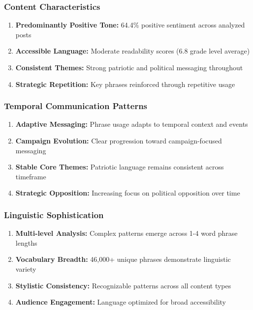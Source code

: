 \documentclass[12pt,a4paper]{article}
\begin{document}
\subsubsection{Content Characteristics}
\begin{enumerate}
\item \textbf{Predominantly Positive Tone:} 64.4\% positive sentiment across analyzed posts
\item \textbf{Accessible Language:} Moderate readability scores (6.8 grade level average)
\item \textbf{Consistent Themes:} Strong patriotic and political messaging throughout
\item \textbf{Strategic Repetition:} Key phrases reinforced through repetitive usage
\end{enumerate}

\subsubsection{Temporal Communication Patterns}
\begin{enumerate}
\item \textbf{Adaptive Messaging:} Phrase usage adapts to temporal context and events
\item \textbf{Campaign Evolution:} Clear progression toward campaign-focused messaging
\item \textbf{Stable Core Themes:} Patriotic language remains consistent across timeframe
\item \textbf{Strategic Opposition:} Increasing focus on political opposition over time
\end{enumerate}

\subsubsection{Linguistic Sophistication}
\begin{enumerate}
\item \textbf{Multi-level Analysis:} Complex patterns emerge across 1-4 word phrase lengths
\item \textbf{Vocabulary Breadth:} 46,000+ unique phrases demonstrate linguistic variety
\item \textbf{Stylistic Consistency:} Recognizable patterns across all content types
\item \textbf{Audience Engagement:} Language optimized for broad accessibility
\end{enumerate}
\end{document}
